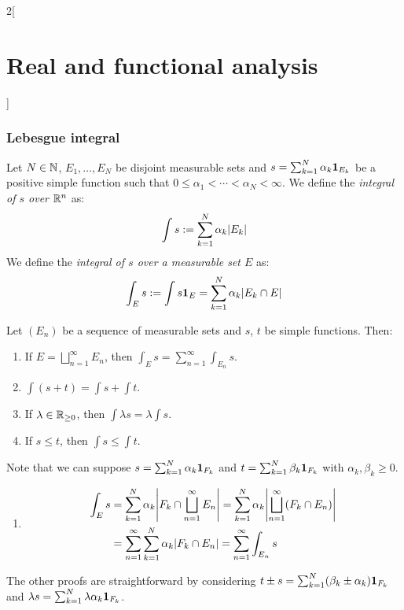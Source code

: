 \documentclass[../../../main_math.tex]{subfiles}
\begin{document}
\begin{multicols}{2}[\section{Real and functional analysis}]
  \subsubsection{Lebesgue integral}
  \begin{definition}
    Let $N\in\mathbb{N}$, $E_1,\ldots,E_N$ be disjoint measurable sets and $s=\sum_{k=1}^N\alpha_k\boldsymbol{\mathrm{1}}_{E_k}$ be a positive simple function such that $0\leq\alpha_1<\cdots<\alpha_N<\infty$. We define the \emph{integral of $s$ over $\mathbb{R}^n$} as: $$\int s:=\sum_{k=1}^N\alpha_k\m{E_k}$$
    We define the \emph{integral of $s$ over a measurable set $E$} as: $$\int_E s:=\int s\indi{E}=\sum_{k=1}^N\alpha_k\m{E_k\cap E}$$
  \end{definition}
  \begin{proposition}
    Let $(E_n)$ be a sequence of measurable sets and $s$, $t$ be simple functions. Then:
    \begin{enumerate}
      \item\label{RFA:proofsigma} If $\displaystyle E=\bigsqcup_{n=1}^\infty E_n$, then $\displaystyle\int_E s=\sum_{n=1}^\infty \int_{E_n} s$.
      \item $\displaystyle\int(s+t)=\int s+\int t$.
      \item If $\lambda\in\mathbb{R}_{\geq 0}$, then $\displaystyle\int \lambda s=\lambda\int s$.
      \item If $s\leq t$, then $\displaystyle\int s\leq\int t$.
    \end{enumerate}
  \end{proposition}
  \begin{sproof}
    Note that we can suppose $s=\sum_{k=1}^N\alpha_k\boldsymbol{\mathrm{1}}_{F_k}$ and $t=\sum_{k=1}^N\beta_k\boldsymbol{\mathrm{1}}_{F_k}$ with $\alpha_k,\beta_k\geq 0$.
    \begin{enumerate}
      \item
            \begin{align*}
              \int_E s & =\sum_{k=1}^N\alpha_k\m{F_k\cap \bigsqcup_{n=1}^\infty E_n}= \sum_{k=1}^N\alpha_k\m{\bigsqcup_{n=1}^\infty(F_k\cap E_n)} \\
                       & =\sum_{n=1}^\infty\sum_{k=1}^N\alpha_k\m{F_k\cap E_n}=\sum_{n=1}^\infty \int_{E_n} s
            \end{align*}
    \end{enumerate}
    The other proofs are straightforward by considering $t\pm s = \sum_{k=1}^N(\beta_k\pm \alpha_k)\boldsymbol{\mathrm{1}}_{F_k}$ and $\lambda s=\sum_{k=1}^N\lambda\alpha_k\boldsymbol{\mathrm{1}}_{F_k}$.
  \end{sproof}
  \begin{proposition}

\end{proposition}
\end{multicols}
\end{document}
